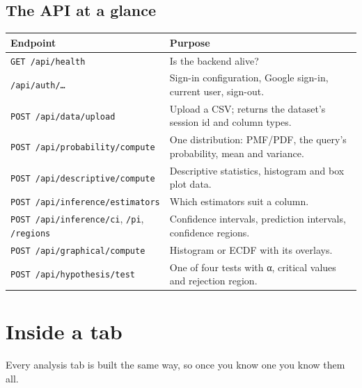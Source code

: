 \documentclass[11pt,a4paper]{article}
\newcommand{\f}[1]{\texttt{#1}}
\begin{document}
\subsection{The API at a glance}
\begin{center}
\small
\begin{tabularx}{\textwidth}{@{}>{\raggedright\arraybackslash}p{5.2cm}L@{}}
\toprule
\textbf{Endpoint} & \textbf{Purpose} \\
\midrule
\f{GET /api/health} & Is the backend alive? \\
\f{/api/auth/…} & Sign-in configuration, Google sign-in, current user, sign-out. \\
\f{POST /api/data/upload} & Upload a CSV; returns the dataset's session id and column types. \\
\f{POST /api/probability/compute} & One distribution: PMF/PDF, the query's probability, mean and variance. \\
\f{POST /api/descriptive/compute} & Descriptive statistics, histogram and box plot data. \\
\f{POST /api/inference/estimators} & Which estimators suit a column. \\
\f{POST /api/inference/ci}, \f{/pi}, \f{/regions} & Confidence intervals, prediction intervals, confidence regions. \\
\f{POST /api/graphical/compute} & Histogram or ECDF with its overlays. \\
\f{POST /api/hypothesis/test} & One of four tests with α, critical values and rejection region. \\
\bottomrule
\end{tabularx}
\end{center}

\section{Inside a tab}

Every analysis tab is built the same way, so once you know one you know them all.
\end{document}
